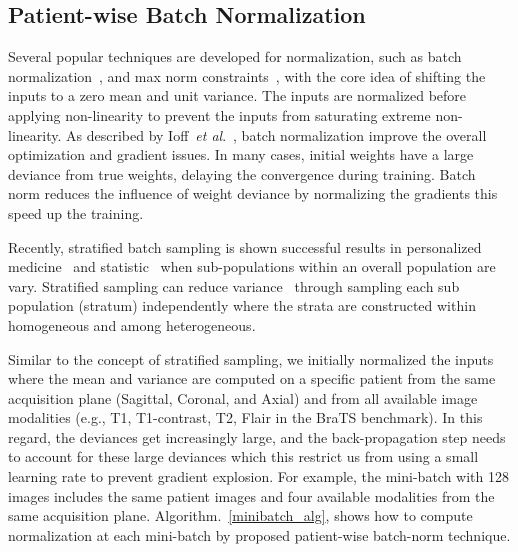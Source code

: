 \documentclass[10pt,twocolumn,letterpaper]{article}
\begin{document}
\subsection{Patient-wise Batch Normalization}\label{batch_norm}
Several popular techniques are developed for normalization, such as batch normalization~\cite{IoffeS15}, and max norm constraints~\cite{srebro2005rank}, with the core idea of shifting the inputs to a zero mean and unit variance. The inputs are normalized before applying non-linearity to prevent the inputs from saturating extreme non-linearity. As described by Ioff~\textit{et al}.~\cite{IoffeS15}, batch normalization improve the overall optimization and gradient issues. In many cases, initial weights have a large deviance from true weights, delaying the convergence during training. Batch norm reduces the influence of weight deviance by normalizing the gradients this speed up the training.

Recently, stratified batch sampling is shown successful results in personalized medicine~\cite{kim2013stratified} and statistic~\cite{keramat1998study} when sub-populations within an overall population are vary. Stratified sampling can reduce variance~\cite{zhao2014accelerating} through sampling each sub population (stratum) independently where the strata are constructed within homogeneous and among heterogeneous.

Similar to the concept of stratified sampling, we initially normalized the inputs where the mean and variance are computed on a specific patient from the same acquisition plane (Sagittal, Coronal, and Axial) and from all available image modalities (e.g., T1, T1-contrast, T2, Flair in the BraTS benchmark).
In this regard, the deviances get increasingly large, and the back-propagation step needs to account for these large deviances which this restrict us from using a small learning rate to prevent gradient explosion. For example, the mini-batch with 128 images includes the same patient images and four available modalities from the same acquisition plane. Algorithm.~\ref{minibatch_alg}, shows how to compute normalization at each mini-batch by proposed patient-wise batch-norm technique.
\end{document}

